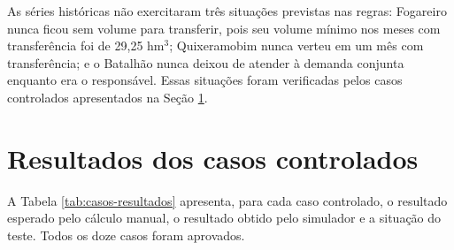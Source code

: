 As séries históricas não exercitaram três situações previstas nas regras: Fogareiro nunca ficou sem volume para transferir, pois seu volume mínimo nos meses com transferência foi de 29,25 hm$^3$; Quixeramobim nunca verteu em um mês com transferência; e o Batalhão nunca deixou de atender à demanda conjunta enquanto era o responsável. Essas situações foram verificadas pelos casos controlados apresentados na Seção \ref{sec:resultado-casos}.

\section{Resultados dos casos controlados}
\label{sec:resultado-casos}

A Tabela \ref{tab:casos-resultados} apresenta, para cada caso controlado, o resultado esperado pelo cálculo manual, o resultado obtido pelo simulador e a situação do teste. Todos os doze casos foram aprovados.

